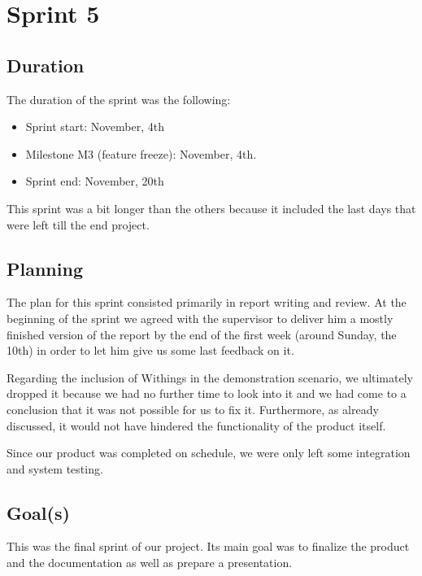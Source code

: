 

\chapter{Sprint 5}
\label{Sprint0}

\section{Duration}
The duration of the sprint was the following:
\begin{itemize}
\item Sprint start:  November, 4th
\item Milestone M3 (feature freeze): November, 4th.
\item Sprint end: November, 20th
\end{itemize}

This sprint was a bit longer than the others because it included the last days
that were left till the end project.

\section{Planning}

The plan for this sprint consisted primarily in report writing and review.
At the beginning of the sprint we agreed with the supervisor to deliver him a mostly
finished version of the report by the end of the first week (around Sunday, the 10th)
in order to let him give us some last feedback on it.

Regarding the inclusion of Withings in the demonstration scenario, we ultimately
dropped it because we had no further time to look into it and we had
come to a conclusion that it was not possible for us to fix it.
Furthermore, as already discussed, it would not have hindered the functionality
of the product itself.

Since our product was completed on schedule, we were only left some
integration and system testing.

\section{Goal(s)}

This was the final sprint of our project. Its main goal was to
finalize the product and the documentation as well as prepare a presentation.

